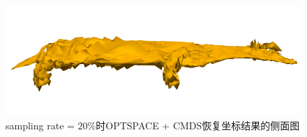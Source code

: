 \begin{figure}[h]
	\centering
	\includegraphics[width=1.0\textwidth]{figure/Cow_opt_20.png}
	\caption{sampling rate = $20\%$时OPTSPACE + CMDS恢复坐标结果的侧面图}
 	\label{fig:cow_opt_20}
\end{figure}